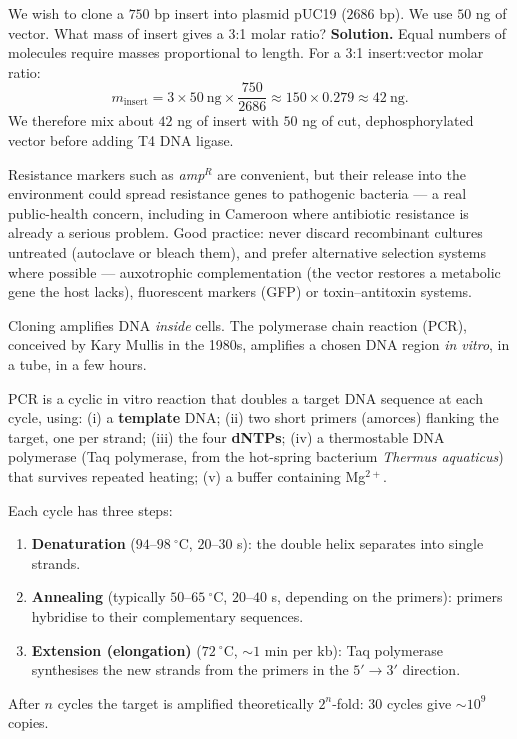 \documentclass[11pt]{article}
\newcommand{\cle}[1]{{\popxbold\color{popdark}#1}}
\newcounter{popsec}
\newcounter{popsub}
\newcommand{\courssub}[1]{%
  \stepcounter{popsub}%
  \par\vspace{9pt}\noindent{\popxbold\fontsize{11.5}{13}\selectfont\color{popink}{\color{poporange}\thepopsec.\thepopsub}\hspace{6pt}#1}\par\nopagebreak\vspace{4pt}
}
\begin{document}
\begin{exoresolu}
We wish to clone a $750$ bp insert into plasmid pUC19 ($2686$ bp). We use $50$ ng of vector. What mass of insert gives a 3:1 molar ratio?
\tcblower
\textbf{Solution.} Equal numbers of molecules require masses proportional to length. For a 3:1 insert:vector molar ratio:
\[
m_{\text{insert}} = 3 \times 50\ \text{ng} \times \frac{750}{2686} \approx 150 \times 0.279 \approx 42\ \text{ng}.
\]
We therefore mix about $42$ ng of insert with $50$ ng of cut, dephosphorylated vector before adding T4 DNA ligase.
\end{exoresolu}

\begin{attention}
Resistance markers such as \emph{amp}$^R$ are convenient, but their release into the environment could spread resistance genes to pathogenic bacteria --- a real public-health concern, including in Cameroon where antibiotic resistance is already a serious problem. Good practice: never discard recombinant cultures untreated (autoclave or bleach them), and prefer alternative selection systems where possible --- \cle{auxotrophic complementation} (the vector restores a metabolic gene the host lacks), \cle{fluorescent markers} (GFP) or toxin--antitoxin systems.
\end{attention}

\courssub{DNA amplification by PCR}

Cloning amplifies DNA \emph{inside} cells. The \cle{polymerase chain reaction} (PCR), conceived by Kary Mullis in the 1980s, amplifies a chosen DNA region \emph{in vitro}, in a tube, in a few hours.

\begin{definition}[PCR]
\cle{PCR} is a cyclic in vitro reaction that doubles a target DNA sequence at each cycle, using: (i) a \textbf{template} DNA; (ii) two short \cle{primers} (amorces) flanking the target, one per strand; (iii) the four \textbf{dNTPs}; (iv) a \cle{thermostable DNA polymerase} (Taq polymerase, from the hot-spring bacterium \emph{Thermus aquaticus}) that survives repeated heating; (v) a buffer containing Mg$^{2+}$.
\end{definition}

Each cycle has three steps:
\begin{enumerate}
\item \textbf{Denaturation} ($94$--$98\ ^\circ$C, $20$--$30$ s): the double helix separates into single strands.
\item \textbf{Annealing} (typically $50$--$65\ ^\circ$C, $20$--$40$ s, depending on the primers): primers hybridise to their complementary sequences.
\item \textbf{Extension (elongation)} ($72\ ^\circ$C, $\sim 1$ min per kb): Taq polymerase synthesises the new strands from the primers in the $5'\to3'$ direction.
\end{enumerate}
After $n$ cycles the target is amplified theoretically $2^n$-fold: 30 cycles give $\sim 10^9$ copies.
\end{document}
